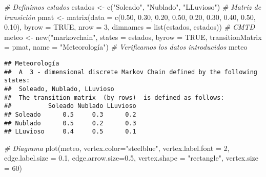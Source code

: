 \documentclass[
]{book}
\newenvironment{Shaded}{\begin{snugshade}}{\end{snugshade}}
\newcommand{\AttributeTok}[1]{\textcolor[rgb]{0.77,0.63,0.00}{#1}}
\newcommand{\CommentTok}[1]{\textcolor[rgb]{0.56,0.35,0.01}{\textit{#1}}}
\newcommand{\ConstantTok}[1]{\textcolor[rgb]{0.00,0.00,0.00}{#1}}
\newcommand{\DecValTok}[1]{\textcolor[rgb]{0.00,0.00,0.81}{#1}}
\newcommand{\FloatTok}[1]{\textcolor[rgb]{0.00,0.00,0.81}{#1}}
\newcommand{\FunctionTok}[1]{\textcolor[rgb]{0.00,0.00,0.00}{#1}}
\newcommand{\NormalTok}[1]{#1}
\newcommand{\OtherTok}[1]{\textcolor[rgb]{0.56,0.35,0.01}{#1}}
\newcommand{\StringTok}[1]{\textcolor[rgb]{0.31,0.60,0.02}{#1}}
\theoremstyle{definition}
\theoremstyle{definition}
\theoremstyle{definition}
\theoremstyle{definition}
\theoremstyle{remark}
\begin{document}
\begin{Shaded}
\begin{Highlighting}[]
\CommentTok{\# Definimos estados}
\NormalTok{estados }\OtherTok{\textless{}{-}} \FunctionTok{c}\NormalTok{(}\StringTok{"Soleado"}\NormalTok{, }\StringTok{"Nublado"}\NormalTok{, }\StringTok{"LLuvioso"}\NormalTok{)}
\CommentTok{\# Matriz de transición }
\NormalTok{pmat }\OtherTok{\textless{}{-}} \FunctionTok{matrix}\NormalTok{(}\AttributeTok{data =} \FunctionTok{c}\NormalTok{(}\FloatTok{0.50}\NormalTok{, }\FloatTok{0.30}\NormalTok{, }\FloatTok{0.20}\NormalTok{, }
                        \FloatTok{0.50}\NormalTok{, }\FloatTok{0.20}\NormalTok{, }\FloatTok{0.30}\NormalTok{, }
                        \FloatTok{0.40}\NormalTok{, }\FloatTok{0.50}\NormalTok{, }\FloatTok{0.10}\NormalTok{), }
               \AttributeTok{byrow =} \ConstantTok{TRUE}\NormalTok{, }\AttributeTok{nrow =} \DecValTok{3}\NormalTok{, }
               \AttributeTok{dimnames =} \FunctionTok{list}\NormalTok{(estados, estados))}
\CommentTok{\# CMTD}
\NormalTok{meteo }\OtherTok{\textless{}{-}} \FunctionTok{new}\NormalTok{(}\StringTok{"markovchain"}\NormalTok{, }\AttributeTok{states =}\NormalTok{ estados, }
                 \AttributeTok{byrow =} \ConstantTok{TRUE}\NormalTok{, }\AttributeTok{transitionMatrix =}\NormalTok{ pmat, }
             \AttributeTok{name =} \StringTok{"Meteorología"}\NormalTok{)}
\CommentTok{\# Verificamos los datos introducidos}
\NormalTok{meteo}
\end{Highlighting}
\end{Shaded}

\begin{verbatim}
## Meteorología 
##  A  3 - dimensional discrete Markov Chain defined by the following states: 
##  Soleado, Nublado, LLuvioso 
##  The transition matrix  (by rows)  is defined as follows: 
##          Soleado Nublado LLuvioso
## Soleado      0.5     0.3      0.2
## Nublado      0.5     0.2      0.3
## LLuvioso     0.4     0.5      0.1
\end{verbatim}

\begin{Shaded}
\begin{Highlighting}[]
\CommentTok{\# Diagrama}
\FunctionTok{plot}\NormalTok{(meteo, }\AttributeTok{vertex.color=}\StringTok{"steelblue"}\NormalTok{, }
     \AttributeTok{vertex.label.font =} \DecValTok{2}\NormalTok{, }
     \AttributeTok{edge.label.size =} \FloatTok{0.1}\NormalTok{,}
     \AttributeTok{edge.arrow.size=}\FloatTok{0.5}\NormalTok{, }
     \AttributeTok{vertex.shape =} \StringTok{"rectangle"}\NormalTok{, }
     \AttributeTok{vertex.size =} \DecValTok{60}\NormalTok{)}
\end{Highlighting}
\end{Shaded}
\end{document}
